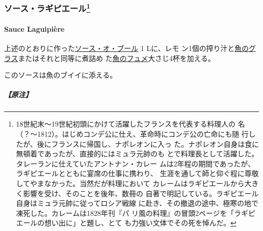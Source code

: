 \begin{recette}
\hypertarget{ux30bdux30fcux30b9ux30e9ux30aeux30d4ux30a8ux30fcux30eb62}{%
\subsubsection[ソース・ラギピエール]{\texorpdfstring{ソース・ラギピエール\footnote{18世紀末〜19世紀初頭にかけて活躍したフランスを代表する料理人の
  名（？〜1812）。はじめコンデ公に仕え、革命時にコンデ公の亡命にも随
  行したが、後にフランスに帰国し、ナポレオンに入っ
  た。ナポレオン自身は食に無頓着であったが、直接的にはミュラ元帥のも
  とで料理長として活躍した。タレーランに仕えていたアントナン・カレー
  ムは2年程の期間であったが、ラギピエールとともに宴席の仕事に携わり、
  生涯を通して師と仰ぐ程に尊敬してやまなかった。当然だが料理において
  カレームはラギピエールから大きく影響を受け、そのことを後年、数冊の
  自著で明記している。ラギピエール自身はミュラ元帥に従ってロシア戦線
  に赴き、その撤退の途中、極寒の地で凍死した。カレームは1828年刊『パ
  リ風の料理』の冒頭2ページを「ラギピエールの想い出に」と題し、とて
  も力強い文体でその死を悼んだ。}}{ソース・ラギピエール}}\label{ux30bdux30fcux30b9ux30e9ux30aeux30d4ux30a8ux30fcux30eb62}}

\hypertarget{sauce-laguipiere}{%
\paragraph{Sauce Laguipière}\label{sauce-laguipiere}}

上述のとおりに作った\protect\hyperlink{sauce-au-beurre}{ソース・オ・ブール}
1 Lに、レモ
ン1個の搾り汁と\protect\hyperlink{glace-de-poisson}{魚のグラス}またはそれと同等に煮詰め
た\protect\hyperlink{fumet-de-poisson}{魚のフュメ}大さじ4杯を加える。

このソースは魚のブイイに添える。

\hypertarget{ux539fux6ce8-12}{%
\subparagraph{【原注】}\label{ux539fux6ce8-12}}


\end{recette}
